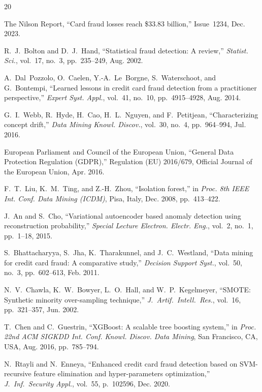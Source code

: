\documentclass[conference,10pt]{IEEEtran}
\begin{document}
\begin{thebibliography}{20}

The Nilson Report, ``Card fraud losses reach \$33.83 billion,'' Issue~1234, Dec. 2023.

R.~J.~Bolton and D.~J.~Hand, ``Statistical fraud detection: A review,'' \textit{Statist. Sci.}, vol.~17, no.~3, pp.~235--249, Aug. 2002.

A.~Dal~Pozzolo, O.~Caelen, Y.-A.~Le~Borgne, S.~Waterschoot, and G.~Bontempi, ``Learned lessons in credit card fraud detection from a practitioner perspective,'' \textit{Expert Syst. Appl.}, vol.~41, no.~10, pp.~4915--4928, Aug. 2014.

G.~I.~Webb, R.~Hyde, H.~Cao, H.~L.~Nguyen, and F.~Petitjean, ``Characterizing concept drift,'' \textit{Data Mining Knowl. Discov.}, vol.~30, no.~4, pp.~964--994, Jul. 2016.

European Parliament and Council of the European Union, ``General Data Protection Regulation (GDPR),'' Regulation (EU) 2016/679, Official Journal of the European Union, Apr. 2016.

F.~T.~Liu, K.~M.~Ting, and Z.-H.~Zhou, ``Isolation forest,'' in \textit{Proc. 8th IEEE Int. Conf. Data Mining (ICDM)}, Pisa, Italy, Dec. 2008, pp.~413--422.

J.~An and S.~Cho, ``Variational autoencoder based anomaly detection using reconstruction probability,'' \textit{Special Lecture Electron. Electr. Eng.}, vol.~2, no.~1, pp.~1--18, 2015.

S.~Bhattacharyya, S.~Jha, K.~Tharakunnel, and J.~C.~Westland, ``Data mining for credit card fraud: A comparative study,'' \textit{Decision Support Syst.}, vol.~50, no.~3, pp.~602--613, Feb. 2011.

N.~V.~Chawla, K.~W.~Bowyer, L.~O.~Hall, and W.~P.~Kegelmeyer, ``SMOTE: Synthetic minority over-sampling technique,'' \textit{J.~Artif.~Intell.~Res.}, vol.~16, pp.~321--357, Jun. 2002.

T.~Chen and C.~Guestrin, ``XGBoost: A scalable tree boosting system,'' in \textit{Proc. 22nd ACM SIGKDD Int. Conf. Knowl. Discov. Data Mining}, San Francisco, CA, USA, Aug. 2016, pp.~785--794.

N.~Rtayli and N.~Enneya, ``Enhanced credit card fraud detection based on SVM-recursive feature elimination and hyper-parameters optimization,'' \textit{J.~Inf.~Security Appl.}, vol.~55, p.~102596, Dec. 2020.


\end{thebibliography}
\end{document}
